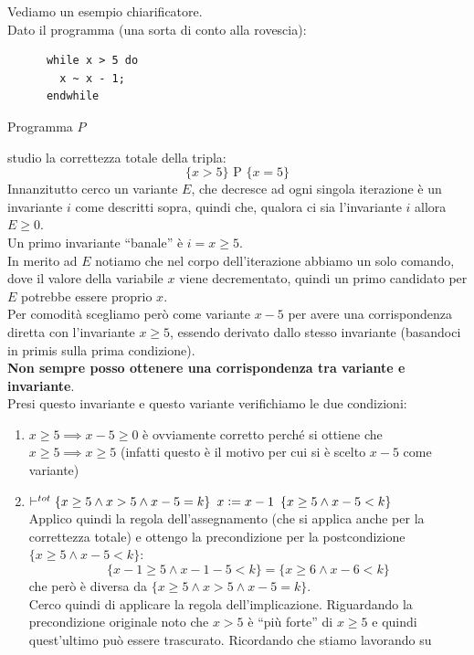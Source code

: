 \documentclass[a4paper,12pt, oneside]{book}
\def\cceq{\mathrel{\vcenter{\hbox{:}}{=}}}
\begin{document}
\begin{esempio}
  Vediamo un esempio chiarificatore.\\
  Dato il programma (una sorta di conto alla rovescia):
  \begin{listing}[H]
    \begin{lstlisting}
      while x > 5 do
        x ~ x - 1;
      endwhile  
    \end{lstlisting}
    \caption{Programma $P$}
    \label{E:t}
  \end{listing}
  studio la correttezza totale della tripla:
  \[\{x>5\}\mbox{ P }\{x=5\}\]
  Innanzitutto cerco un variante $E$, che decresce ad ogni singola iterazione è
  un invariante $i$ come descritti sopra, quindi che, qualora ci sia
  l'invariante $i$ allora  $E\geq 0$.\\
  Un primo invariante ``banale'' è $i=x\geq 5$.\\
  In merito ad $E$ notiamo che nel corpo dell'iterazione abbiamo un solo
  comando, dove il valore della variabile $x$ viene decrementato, quindi un
  primo candidato per $E$ potrebbe essere proprio $x$.\\
  Per comodità scegliamo però come variante $x-5$ per avere una
  corrispondenza diretta con l'invariante $x\geq 5$, essendo derivato dallo
  stesso invariante (basandoci in primis sulla prima condizione).\\
  \textbf{Non sempre posso ottenere una corrispondenza tra variante e
    invariante}.\\
  Presi questo invariante e questo variante verifichiamo le due condizioni:
  \begin{enumerate}
    \item $x\geq 5\implies x-5\geq 0$ è ovviamente corretto perché si ottiene
    che $x\geq 5\implies x \geq 5$ (infatti questo è il motivo per cui si è
    scelto $x-5$ come variante)
    \item $\vdash^{tot}\{x\geq 5\land x>5\land x-5=k\}\,\,\,x\cceq
    x-1\,\,\,\{x\geq 5\land x-5<k\}$\\
    Applico quindi la regola dell'assegnamento (che si applica anche per la
    correttezza totale) e ottengo la precondizione per la postcondizione
    $\{x\geq 5\land x-5<k\}$:
    \[\{x-1\geq 5\land x-1-5<k\}=\{x\geq 6\land x-6 < k\}\]
    che però è diversa da $\{x\geq 5\land x>5\land x-5=k\}$.\\
    Cerco quindi di applicare la regola dell'implicazione. Riguardando la
    precondizione originale noto che $x>5$ è ``più forte'' di $x\geq 5$ e quindi
    quest'ultimo può essere trascurato. Ricordando che stiamo lavorando su

\end{enumerate}
\end{esempio}
\end{document}
